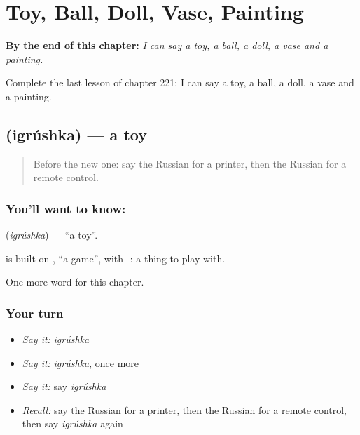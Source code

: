 
\chapter{Toy, Ball, Doll, Vase, Painting}
\label{ch:ru-toy-ball-doll-vase-painting}

\begin{chapteropening}
\textbf{By the end of this chapter:} \emph{I can say a toy, a ball, a doll, a vase and a painting.}

Complete the last lesson of chapter 221: I can say a toy, a ball, a doll, a vase and a painting.
\end{chapteropening}

\section[\texorpdfstring{\ru{игрушка} (igrúshka)}{игрушка (igrúshka)}]{ (igrúshka) — a toy}

\label{lesson:RU-C221-igrushka}



\begin{quote}
Before the new one: say the Russian for a printer, then the Russian for a remote control.
\end{quote}

\subsection*{You'll want to know: }
\textbf{} (\emph{igrúshka}) — \textquotedblleft{}a toy\textquotedblright{}.

\begin{cousinweb}
\textbf{} is built on \emph{}, \textquotedblleft{}a game\textquotedblright{}, with \emph{-}: a thing to play with.
\end{cousinweb}

\begin{grammarlens}[title={What you've built}]
One more word for this chapter.
\end{grammarlens}

\subsection*{Your turn}
\begin{itemize}
\raggedright
  \item \emph{Say it:} \emph{igrúshka}
  \item \emph{Say it:} \emph{igrúshka}, once more
  \item \emph{Say it:} say \emph{igrúshka}
  \item \emph{Recall:} say the Russian for a printer, then the Russian for a remote control, then say \emph{igrúshka} again
\end{itemize}

